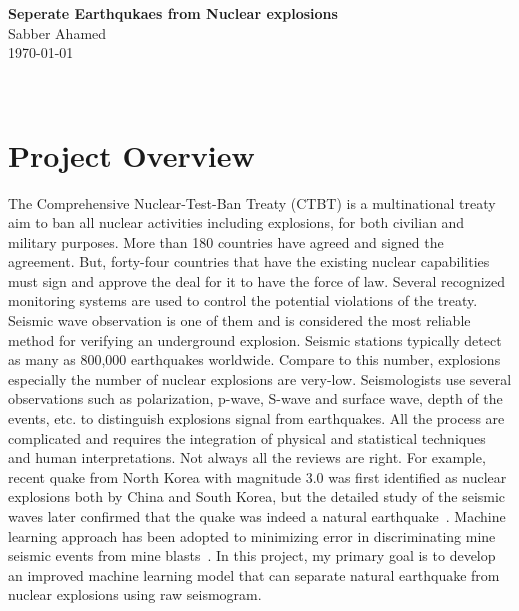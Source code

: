 \documentclass[12pt]{article}
\begin{document}
    
    
        \begin{minipage}[c]{1.0 \textwidth}
            \begin{center}
                \Large{\textbf{Seperate Earthqukaes from Nuclear explosions}}\\[0.5em]
                Sabber Ahamed\\
                \today
            \end{center}
        \end{minipage}\\[2em]
        
        \section{Project Overview}
            
        The Comprehensive Nuclear-Test-Ban Treaty (CTBT) is a multinational treaty aim to ban all nuclear activities including explosions, for both civilian and military purposes.  More than 180 countries have agreed and signed the agreement.  But, forty-four countries that have the existing nuclear capabilities must sign and approve the deal for it to have the force of law. Several recognized monitoring systems are used to control the potential violations of the treaty. Seismic wave observation is one of them and is considered the most reliable method for verifying an underground explosion. Seismic stations typically detect as many as 800,000 earthquakes worldwide. Compare to this number, explosions especially the number of nuclear explosions are very-low. Seismologists use several observations such as polarization, p-wave, S-wave and surface wave, depth of the events, etc. to distinguish explosions signal from earthquakes. All the process are complicated and requires the integration of physical and statistical techniques and human interpretations. Not always all the reviews are right. For example, recent quake from North Korea with magnitude 3.0 was first identified as nuclear explosions both by China and South Korea, but the detailed study of the seismic waves later confirmed that the quake was indeed a natural earthquake~\citep{telegraphNatural2017}. Machine learning approach has been adopted to minimizing error in discriminating mine seismic events from mine blasts~\citep{dong2016discrimination}. In this project, my primary goal is to develop an improved machine learning model that can separate natural earthquake from nuclear explosions using raw seismogram.
        
\end{document}
